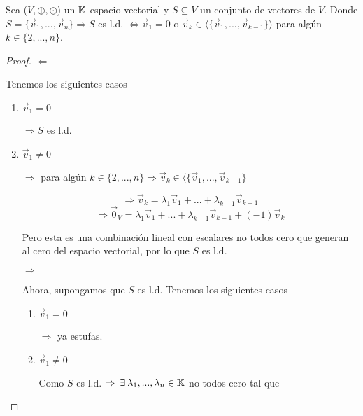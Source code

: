 \begin{theorem} \label{teo117}
     Sea ($V, \oplus, \odot$) un $\mathbb{K}$-espacio vectorial y $S \subseteq V$ un conjunto de vectores de $V$. Donde $S = \{{\vec{v}}_{1},...,{\vec{v}}_{n}\} \Rightarrow S$ es l.d. $\iff {\vec{v}}_{1} = 0$ o ${\vec{v}}_{k} \in \langle \{{\vec{v}}_{1},...,{\vec{v}}_{k-1}\} \rangle$ para algún $k \in \{ 2, ..., n \}$.
\end{theorem}

\begin{proof}
    $\Leftarrow$ 

    Tenemos los siguientes casos

    \begin{enumerate}
        \item ${\vec{v}}_{1} = 0$

        $\Rightarrow S$ es l.d.

        \item ${\vec{v}}_{1} \neq 0$

        $\Rightarrow$ para algún $k \in \{ 2, ..., n \} \Rightarrow {\vec{v}}_{k} \in \langle \{{\vec{v}}_{1},...,{\vec{v}}_{k-1}\}$

        \begin{equation*}
            \Rightarrow {\vec{v}}_{k} = {\lambda}_{1}{\vec{v}}_{1} + ... + {\lambda}_{k-1}{\vec{v}}_{k-1}
        \end{equation*}
        \begin{equation*}
            \Rightarrow {\vec{0}}_{V} = {\lambda}_{1}{\vec{v}}_{1} + ... + {\lambda}_{k-1}{\vec{v}}_{k-1} + (-1) {\vec{v}}_{k}
        \end{equation*}

        Pero esta es una combinación lineal con escalares no todos cero que generan al cero del espacio vectorial, por lo que $S$ es l.d.

        $\Rightarrow$

        Ahora, supongamos que $S$ es l.d. Tenemos los siguientes casos

        \begin{enumerate}
            \item ${\vec{v}}_{1} = 0$

        $\Rightarrow $ ya estufas.

        \item ${\vec{v}}_{1} \neq 0$

        Como $S$ es l.d. $\Rightarrow \: \exists \:  {\lambda}_{1}, ..., {\lambda}_{n} \in \mathbb{K}$ no todos cero tal que


\end{enumerate}
\end{enumerate}
\end{proof}
